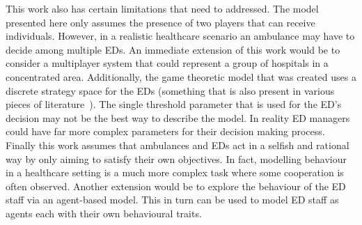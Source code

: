 This work also has certain limitations that need to addressed.
The model presented here only assumes the presence of two players that can
receive individuals. 
However, in a realistic healthcare scenario an ambulance may have to decide 
among multiple EDs.
An immediate extension of this work would be to consider a multiplayer system
that could represent a group of hospitals in a concentrated area.
Additionally, the game theoretic model that was created uses a discrete 
strategy space for the EDs (something that is also present in various pieces of 
literature~\cite{deo2011centralized, knight2017measuring}).
The single threshold parameter that is used for the ED's decision may not be 
the best way to describe the model.
In reality ED managers could have far more complex parameters for their 
decision making process.
Finally this work assumes that ambulances and EDs act in a selfish and rational
way by only aiming to satisfy their own objectives.
In fact, modelling behaviour in a healthcare setting is a much more complex 
task where some cooperation is often observed.
Another extension would be to explore the behaviour of the ED staff via an 
agent-based model. 
This in turn can be used to model ED staff as agents each with their own 
behavioural traits.
